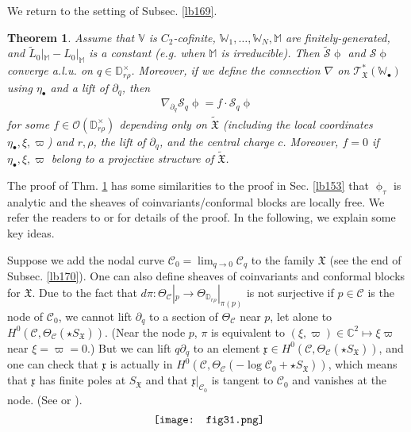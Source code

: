 \documentclass[12pt,a4paper,notitlepage]{article}
\theoremstyle{definition}
\theoremstyle{plain}
\newtheorem{thm}[df]{Theorem}
\newcommand{\fk}{\mathfrak}
\newcommand{\mc}{\mathcal}
\newcommand{\wtd}{\widetilde}
\newcommand{\scr}{\mathscr}
\newcommand{\xk}{\mathfrak x}
\newcommand{\SX}{{S_{\fk X}}}
\newcommand{\blt}{\bullet}
\newcommand{\Vbb}{\mathbb V}
\newcommand{\Wbb}{\mathbb W}
\newcommand{\Mbb}{\mathbb M}
\newcommand{\Cbb}{\mathbb C}
\newcommand{\Dbb}{\mathbb D}
\numberwithin{equation}{section}
\begin{document}
We return to the setting of Subsec. \ref{lb169}.
\begin{thm}\label{lb171}
Assume that $\Vbb$ is $C_2$-cofinite,  $\Wbb_1,\dots,\Wbb_N,\Mbb$ are finitely-generated, and $\wtd L_0|_\Mbb-L_0|_\Mbb$ is a constant (e.g. when $\Mbb$ is irreducible). Then $\wtd{\mc S}\upphi$ and $\mc S\upphi$ converge a.l.u. on $q\in\Dbb_{r\rho}^\times$. Moreover, if we define the connection $\nabla$ on $\scr T_{\fk X}^*(\Wbb_\blt)$ using $\eta_\blt$ and a lift of $\partial_q$, then
\begin{align}
\nabla_{\partial_q}\mc S_q\upphi=f\cdot\mc S_q\upphi
\end{align}
for some $f\in\scr O(\Dbb_{r\rho}^\times)$ depending only on $\wtd{\fk X}$ (including the local coordinates $\eta_\blt,\xi,\varpi$) and $r,\rho$, the lift of $\partial_q$, and the central charge $c$. Moreover, $f=0$  if $\eta_\blt,\xi,\varpi$ belong to a projective structure of $\wtd{\fk X}$.
\end{thm}

The proof of Thm. \ref{lb171} has some similarities to the proof in Sec. \ref{lb153} that  $\upphi_\tau$ is analytic and the sheaves of coinvariants/conformal blocks are locally free. We refer the readers to \cite[Sec. 4.3]{Gui} or \cite[Sec. 11]{Gui20} for details of the proof. In the following, we explain some key ideas.

Suppose we add the nodal curve $\mc C_0=\lim_{q\rightarrow 0}\mc C_q$ to the family $\fk X$ (see the end of Subsec. \ref{lb170}). One can also define sheaves of coinvariants and conformal blocks for $\fk X$. Due to the fact that $d\pi:\Theta_{\mc C}|_p\rightarrow \Theta_{\Dbb_{r\rho}}|_{\pi(p)}$ is not surjective if $p\in\mc C$ is the node of $\mc C_0$, we cannot lift $\partial_q$ to a section of $\Theta_{\mc C}$ near $p$, let alone to  $H^0(\mc C,\Theta_{\mc C}(\star\SX))$. (Near the node $p$, $\pi$ is equivalent to $(\xi,\varpi)\in\Cbb^2\mapsto \xi\varpi$ near $\xi=\varpi=0$.) But we can lift $q\partial_q$ to an element $\xk\in H^0(\mc C,\Theta_{\mc C}(\star\SX))$, and one can check that $\xk$ is actually in $ H^0(\mc C,\Theta_{\mc C}(-\log\mc C_0+\star\SX))$, which means that $\xk$ has finite poles at $\SX$ and that $\xk|_{\mc C_0}$ is tangent to $\mc C_0$ and vanishes at the node. (See \cite[Sec. 3.6]{Gui} or \cite[Sec. 11]{Gui20}). 
\begin{align}
\vcenter{\hbox{{
\texttt{[image: fig31.png]}}}}
\end{align}
\end{document}
